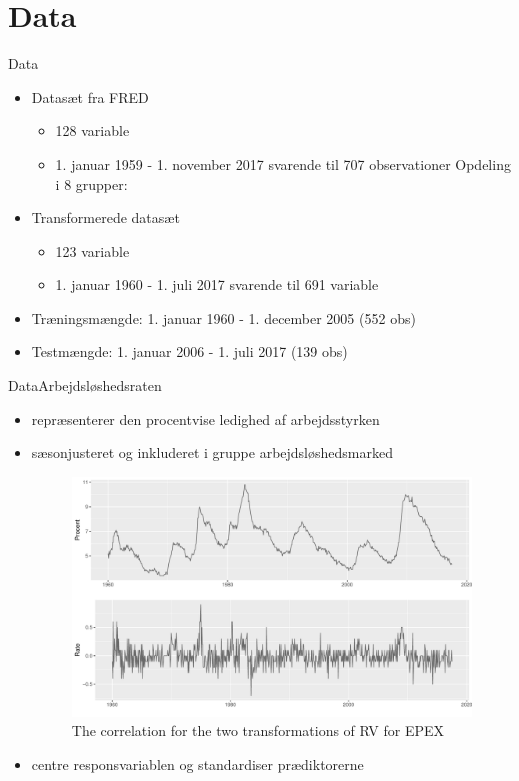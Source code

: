 \section{Data}
\begin{frame}{Data}
\begin{itemize}
\item Datasæt fra FRED
\begin{itemize}
\item 128 variable
\item 1. januar 1959 - 1. november 2017 svarende til 707 observationer
Opdeling i 8 grupper:
\end{itemize}
\item Transformerede datasæt
\begin{itemize}
\item 123 variable
\item 1. januar 1960 - 1. juli 2017 svarende til 691 variable
\end{itemize}
\item Træningsmængde: 1. januar 1960 - 1. december 2005 (552 obs)
\item Testmængde: 1. januar 2006 - 1. juli 2017 (139 obs)
\end{itemize}
\end{frame}

\begin{frame}{Data}{Arbejdsløshedsraten}
\begin{itemize}
\item repræsenterer den procentvise ledighed af arbejdsstyrken
\item sæsonjusteret og inkluderet i gruppe arbejdsløshedsmarked
%
\begin{figure}
 \includegraphics[width=1\linewidth, height=0.7\textheight]{slides/unemployment.pdf}
 \caption{The correlation for the two transformations of RV for EPEX}
 \end{figure}
%
\item centre responsvariablen og standardiser prædiktorerne
\end{itemize}
\end{frame}

